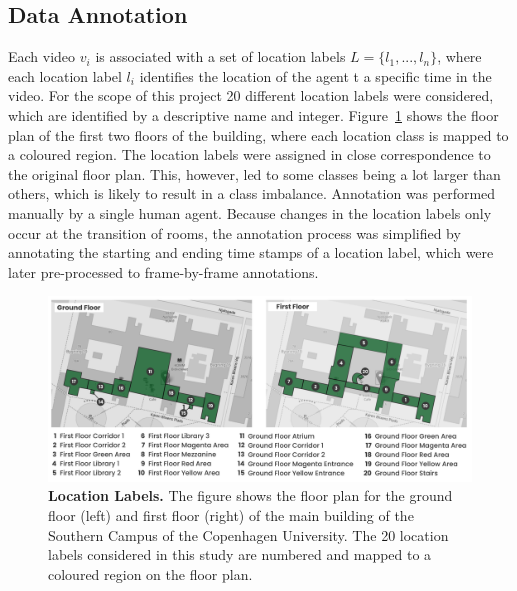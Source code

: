 \documentclass[a4paper]{article}
\begin{document}
\subsection{Data Annotation} %
\label{sub:data-annotation}

Each video $v_i$ is associated with a set of location labels $L = \{l_1, ...,
l_n\}$, where each location label $l_i$ identifies the location of the agent t
a specific time in the video. For the scope of this project 20 different
location labels were considered, which are identified by a descriptive name and
integer. Figure~\ref{fig:location-labels} shows the floor plan of the first two
floors of the building, where each location class is mapped to a coloured
region. The location labels were assigned in close correspondence to the
original floor plan. This, however, led to some classes being a lot larger than
others, which is likely to result in a class imbalance. Annotation was performed
manually by a single human agent. Because changes in the location labels only
occur at the transition of rooms, the annotation process was simplified by
annotating the starting and ending time stamps of a location label, which were
later pre-processed to frame-by-frame annotations. 

\begin{figure}
\centering
\includegraphics[width=\textwidth]{figures/location-labels.png}
\caption{
  \textbf{Location Labels.} The figure shows the floor plan for the ground floor
  (left) and first floor (right) of the main building of the Southern Campus of
  the Copenhagen University. The 20 location labels considered in this study are
  numbered and mapped to a coloured region on the floor plan.}

\label{fig:location-labels}
\end{figure}


\end{document}
